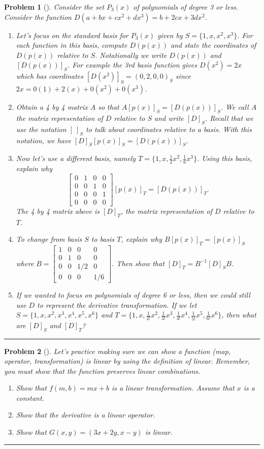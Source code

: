 \documentclass[letterpaper,oneside]{book}%
\theoremstyle{plain}
\theoremstyle{box}
\theoremstyle{problem}
\newtheorem{problemnum}{Problem}[chapter]
\newenvironment{problem}[1][]{\begin{problemnum}[#1]}{\end{problemnum}\nopagebreak\hrule\bigskip}
\newcommand{\bvec}[1]{\begin{bmatrix} #1 \end{bmatrix}}
\begin{document}
\begin{problem}
 Consider the set $P_3(x)$ of polynomials of degree 3 or less.  Consider the function $D(a+bx+cx^2+dx^3) = b+2cx+3dx^2$.
 \begin{enumerate}
  \item Let's focus on the standard basis for $P_3(x)$ given by $S=\{1,x,x^2,x^3\}$.  For each function in this basis, compute $D(p(x))$ and state the coordinates of $D(p(x))$ relative to $S$. Notationally we write $D(p(x))$ and $[D(p(x))]_S$. For example the 3rd basis function gives $D(x^2) =2x$ which has coordinates $[D(x^2)]_S=(0,2,0,0)_S$ since $2x = 0(1)+2(x)+0(x^2)+0(x^3)$.  
  \item Obtain a 4 by 4 matrix $A$ so that $A[p(x)]_S = [D(p(x))]_S$. We call $A$ the matrix representation of $D$ relative to $S$ and write $[D]_S$. Recall that we use the notation $[\ ]_S$ to talk about coordinates relative to a basis. With this notation, we have $[D]_S[p(x)]_S = [D(p(x))]_S$. 
  \item Now let's use a different basis, namely $T=\{1,x,\frac{1}{2}x^2,\frac{1}{6}x^3\}$. Using this basis, explain why
  $$\bvec{0&1&0&0\\0&0&1&0\\0&0&0&1\\0&0&0&0}[p(x)]_T=[D(p(x))]_T.$$ The 4 by 4 matrix above is $[D]_T$, the matrix representation of $D$ relative to $T$. 
  \item To change from basis $S$ to basis $T$, explain why $B[p(x)]_T = [p(x)]_S$ where $B=\bvec{1&0&0&0\\0&1&0&0\\0&0&1/2&0\\0&0&0&1/6}$. Then show that $[D]_T =B^{-1}[D]_SB$.  
  \item If we wanted to focus on polynomials of degree 6 or less, then we could still use $D$ to represent the derivative transformation. 
  If we let $S=\{1,x,x^2,x^3,x^4,x^5,x^6\}$ and $T=\{1,x,\frac{1}{2!}x^2,\frac{1}{3!}x^3,\frac{1}{4!}x^4,\frac{1}{5!}x^5,\frac{1}{6!}x^6\}$, then what are $[D]_S$ and $[D]_T$?  
 \end{enumerate}

\end{problem}







\begin{problem}
 Let's practice making sure we can show a function (map, operator, transformation) is linear by using the definition of linear.  Remember, you must show that the function preserves linear combinations. 
 \begin{enumerate}
  \item Show that $f(m,b) = mx+b$ is a linear transformation. Assume that $x$ is a constant.
  \item Show that the derivative is a linear operator. 
  \item Show that $G(x,y) = (3x+2y,x-y)$ is linear.
 \end{enumerate}
\end{problem}
\end{document}

